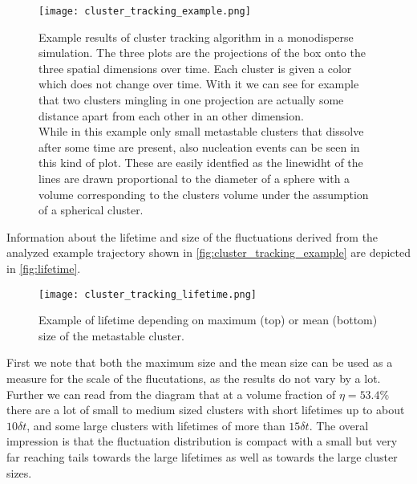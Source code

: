 \begin{figure}[h]
\centering
\texttt{[image: cluster\_tracking\_example.png]}
\caption[Individual cluster tracking example]{Example results of cluster tracking algorithm in a monodisperse simulation. The three plots are the projections of the box onto the three spatial dimensions over time. Each cluster is given a color which does not change over time. With it we can see for example that two clusters mingling in one projection are actually some distance apart from each other in an other dimension.\\
While in this example only small metastable clusters that dissolve after some time are present, also nucleation events can be seen in this kind of plot. These are easily identfied as the linewidht of the lines are drawn proportional to the diameter of a sphere with a volume corresponding to the clusters volume under the assumption of a spherical cluster.}
\label{fig:cluster_tracking_example}
\end{figure}

Information about the lifetime and size of the fluctuations derived from the analyzed example trajectory shown in \autoref{fig:cluster_tracking_example} are depicted in \autoref{fig:lifetime}.
\begin{figure}[h]
\centering
\texttt{[image: cluster\_tracking\_lifetime.png]}
\caption[Example for correlation between a unstable cluster's size and lifetime]{Example of lifetime depending on  maximum (top) or mean (bottom) size of the metastable cluster. }
\label{fig:lifetime}
\end{figure}
First we note that both the maximum size and the mean size can be used as a measure for the scale of the flucutations, as the results do not vary by a lot. Further we can read from the diagram that at a volume fraction of $\eta = 53.4\%$ there are a lot of small to medium sized clusters with short lifetimes up to about $10 \delta t$, and some large clusters with lifetimes of more than $15 \delta t$. The overal impression is that the fluctuation distribution is compact with a small but very far reaching tails towards the large lifetimes as well as towards the large cluster sizes.
